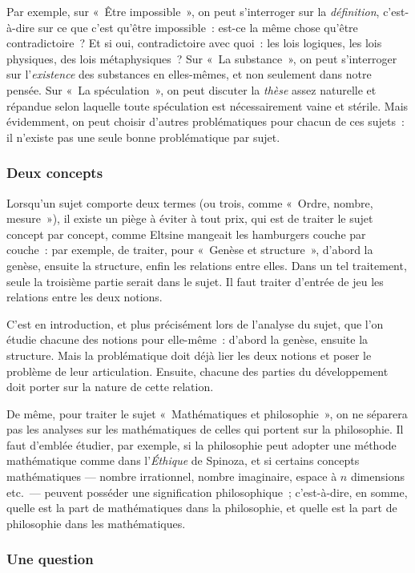 \documentclass[a4paper,12pt]{article}
\begin{document}
Par exemple, sur « Être impossible », on peut s'interroger sur la
\emph{définition}, c'est-à-dire sur ce que c'est qu'être impossible : est-ce
la même chose qu'être contradictoire ? Et si oui, contradictoire avec
quoi : les lois logiques, les lois physiques, des lois métaphysiques ?
Sur « La substance », on peut s'interroger sur l'\emph{existence} des
substances en elles-mêmes, et non seulement dans notre pensée. Sur « La
spéculation », on peut discuter la \emph{thèse} assez naturelle et répandue
selon laquelle toute spéculation est nécessairement vaine et stérile.
Mais évidemment, on peut choisir d'autres problématiques pour chacun de
ces sujets : il n'existe pas une seule bonne problématique par sujet.

\subsubsection{Deux concepts}
\label{sec-2-3-2}

Lorsqu'un sujet comporte deux termes (ou trois, comme « Ordre, nombre,
mesure »), il existe un piège à éviter à tout prix, qui est de traiter le
sujet concept par concept, comme Eltsine mangeait les hamburgers couche
par couche : par exemple, de traiter, pour « Genèse et structure »,
d'abord la genèse, ensuite la structure, enfin les relations entre
elles. Dans un tel traitement, seule la troisième partie serait dans le
sujet. Il faut traiter d'entrée de jeu les relations entre les deux
notions.

C'est en introduction, et plus précisément lors de l'analyse du sujet,
que l'on étudie chacune des notions pour elle-même : d'abord la genèse,
ensuite la structure. Mais la problématique doit déjà lier les deux
notions et poser le problème de leur articulation. Ensuite, chacune des
parties du développement doit porter sur la nature de cette relation.

De même, pour traiter le sujet « Mathématiques et philosophie », on ne
séparera pas les analyses sur les mathématiques de celles qui portent
sur la philosophie. Il faut d'emblée étudier, par exemple, si la
philosophie peut adopter une méthode mathématique comme dans l'\emph{Éthique}
de Spinoza, et si certains concepts mathématiques --- nombre
irrationnel, nombre imaginaire, espace à $n$ dimensions etc. --- peuvent
posséder une signification philosophique ; c'est-à-dire, en somme,
quelle est la part de mathématiques dans la philosophie, et quelle est
la part de philosophie dans les mathématiques.

\subsubsection{Une question}
\label{sec-2-3-3}
\end{document}
